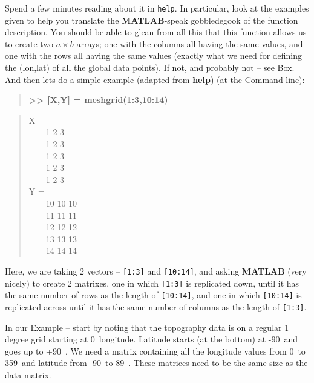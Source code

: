 \documentclass{tufte-book} %
\newenvironment{docspec}{\begin{quotation}\ttfamily\parskip0pt\parindent0pt\ignorespaces}{\end{quotation}}
\newenvironment{docspecbold}{\begin{quotation}\ttfamily\bfseries\parskip0pt\parindent0pt\ignorespaces}{\end{quotation}}
\begin{document}
Spend a few minutes reading about it in \texttt{help}. In particular, look at the examples given to help you translate the \textbf{MATLAB}-speak gobbledegook of the function description. You should be able to glean from all this that this function allows us to create two \(a\times b\) arrays; one with the columns all having the same values, and one with the rows all having the same values (exactly what we need for defining the (lon,lat) of all the global data points). If not, and probably not -- see Box. And then lets do a simple example (adapted from \textbf{help}) (at the Command line):
\begin{docspecbold}
>> [X,Y] = meshgrid(1:3,10:14)
\end{docspecbold}
\begin{docspec}
X =
\\ \ \ \ \ 1     2     3
\\ \ \ \ \ 1     2     3
\\ \ \ \ \ 1     2     3
\\ \ \ \ \ 1     2     3
\\ \ \ \ \ 1     2     3
\\Y =
\\ \ \ \ \ 10    10    10
\\ \ \ \ \ 11    11    11
\\ \ \ \ \ 12    12    12
\\ \ \ \ \ 13    13    13
\\ \ \ \ \ 14    14    14
\end{docspec}
Here, we are taking 2 vectors -- \texttt{[1:3]} and \texttt{[10:14]}, and asking \textbf{MATLAB} (very nicely) to create 2 matrixes, one in which \texttt{[1:3]} is replicated down, until it has the same number of rows as the length of \texttt{[10:14]}, and one in which \texttt{[10:14]} is replicated across until it has the same number of columns as the length of \texttt{[1:3]}. 

In our Example -- start by noting that the topography data is on a regular 1 degree grid starting at 0\degree\ longitude. Latitude starts (at the bottom) at -90\degree\ and goes up to +90\degree\ . We need a matrix containing all the longitude values from 0\degree\ to 359\degree\, and latitude from -90\degree\ to 89\degree\ . These matrices need to be the same size as the data matrix.
\end{document}
